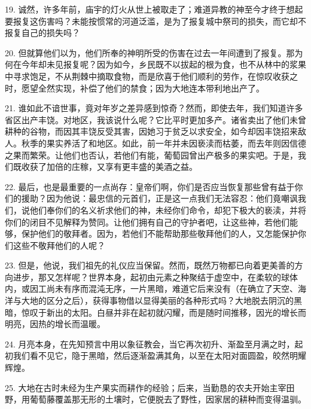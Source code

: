 19. 诚然，许多年前，庙宇的灯火从世上被取走了；难道异教的神至今才终于想起要报复这伤害吗？未能按惯常的河道泛滥，是为了报复城中祭司的损失，而它却不报复自己的损失吗？\par

20. 但就算他们以为，他们所奉的神明所受的伤害在过去一年间遭到了报复。那为何在今年却未见报复呢？因为如今，乡民既不以拔起的根为食，也不从林中的浆果中寻求饱足，不从荆棘中摘取食物，而是欣喜于他们顺利的劳作，在惊叹收获之时，愿望全然实现，补偿了他们的禁食；因为大地连本带利地出产了。\par

21. 谁如此不谙世事，竟对年岁之差异感到惊奇？然而，即使去年，我们知道许多省区出产丰饶。对地区，我该说什么呢？它比平时更加多产。诸省卖出了他们未曾耕种的谷物，而因其丰饶反受其害，因她习于贫乏以求安全，如今却因丰饶招来敌人。秋季的果实养活了和地区。如此，前一年并未因亵渎而枯萎，而去年则因信德之果而繁荣。让他们也否认，若他们有能，葡萄园曾出产极多的果实吧。于是，我们既收获了加倍的庄稼，又享有更丰盛的美酒之益。\par

22. 最后，也是最重要的一点尚存：皇帝们啊，你们是否应当恢复那些曾有益于你们的援助？因为他说：最忠信的元首们，正是这一点我们无法容忍：他们竟嘲讽我们，说他们奉你们的名义祈求他们的神，未经你们命令，却犯下极大的亵渎，并将你们的闭目不见解释为赞同。让他们拥有自己的守护者吧，让这些神，若他们能够，保护他们的敬拜者。因为，若他们不能帮助那些敬拜他们的人，又怎能保护你们这些不敬拜他们的人呢？\par

23. 但是，他说，我们祖先的礼仪应当保留。然而，既然万物都已向着更美善的方向进步，那又怎样呢？世界本身，起初由元素之种聚结于虚空中，在柔软的球体内，或因工尚未有序而混沌无序，一片黑暗，难道它后来没有（在确立了天空、海洋与大地的区分之后），获得事物借以显得美丽的各种形式吗？大地脱去阴沉的黑暗，惊叹于新出的太阳。白昼并非在起初就闪耀，而是随时间推移，因光的增长而明亮，因热的增长而温暖。\par

24. 月亮本身，在先知预言中用以象征教会，当它再次初升、渐盈至月满之时，起初我们看不见它，隐于黑暗，然后逐渐盈满其角，以至在太阳对面圆盈，皎然明耀辉煌。\par

25. 大地在古时未经为生产果实而耕作的经验；后来，当勤恳的农夫开始主宰田野，用葡萄藤覆盖那无形的土壤时，它便脱去了野性，因家居的耕种而变得温驯。\par

